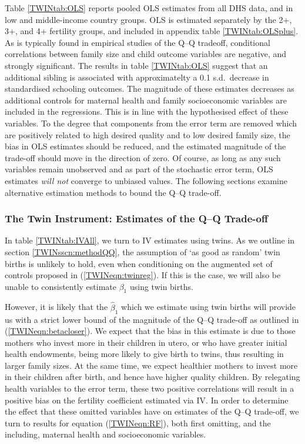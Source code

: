 Table \ref{TWINtab:OLS} reports pooled OLS estimates from all DHS data, and in 
low and middle-income country groups. OLS is estimated separately by the 2+, 3+,
and 4+ fertility groups, and included in appendix table \ref{TWINtab:OLSplus}.
As is typically found in empirical studies of the Q--Q tradeoff, conditional 
correlations between family size and child outcome variables are negative, and 
strongly significant.  The results in table \ref{TWINtab:OLS} suggest that an 
additional sibling is associated with approximatelty a 0.1 s.d.\ decrease in 
standardised schooling outcomes.  The magnitude of these estimates decreases
as additional controls for maternal health and family socioeconomic variables
are included in the regressions. This is in line with the hypothesised effect
of these variables.  To the degree that components from the error term are 
removed which are positively related to high desired quality and to low desired 
family size, the bias in OLS estimates should be reduced, and the estimated 
magnitude of the trade-off should move in the direction of zero. Of course, as 
long as any such variables remain unobserved and as part of the stochastic error 
term, OLS estimates \emph{will not} converge to unbiased values.  The following 
sections examine alternative estimation methods to bound the Q--Q trade-off.

\subsubsection{The Twin Instrument: Estimates of the Q--Q Trade-off}
In table \ref{TWINtab:IVAll}, we turn to IV estimates using twins.  As we 
outline in section \ref{TWINsscn:methodQQ}, the assumption of `as good as 
random' twin births is unlikely to hold, even when conditioning on the augmented
set of controls proposed in (\ref{TWINeqn:twinreg}). If this is the case, we 
will also be unable to consistently estimate $\beta_1$ using twin births.

However, it is likely that the $\hat\beta_1$ which we estimate using twin births 
will provide us with a strict lower bound of the magnitude of the Q--Q trade-off 
as outlined in (\ref{TWINeqn:betacloser}). We expect that the bias in this 
estimate is due to those mothers who invest more in their children in utero, or 
who have greater initial health endowments, being more likely to give birth to 
twins, thus resulting in larger family sizes. At the same time, we expect 
healthier mothers to invest more in their children after birth, and hence have 
higher quality children. By relegating health variables to the error term, 
these two positive correlations will result in a positive bias on the fertility 
coefficient estimated via IV. In order to determine the effect that these 
omitted variables have on estimates of the Q--Q trade-off, we turn to results 
for equation (\ref{TWINeqn:RF}), both first omitting, and the including, 
maternal health and socioeconomic variables.

